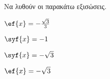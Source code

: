 Να λυθούν οι παρακάτω εξισώσεις.
\begin{multicols}{2}
\begin{alist}
\item $ \ef{x}=-\frac{\sqrt{3}}{3} $
\item $ \syf{x}=-1 $
\item $ \syf{x}=-\sqrt{3} $
\item $ \ef{x}=-\sqrt{3} $
\end{alist}
\end{multicols}
